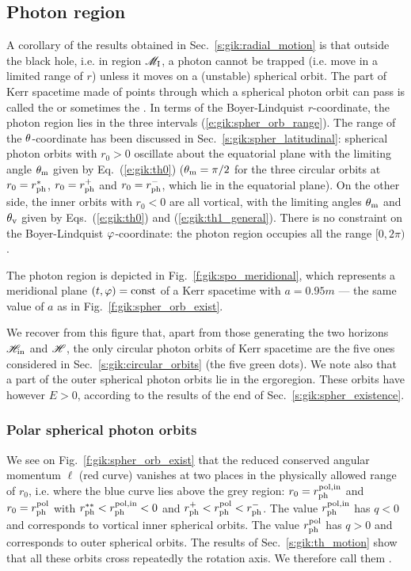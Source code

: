\subsection{Photon region}

A corollary of the results obtained in Sec.~\ref{s:gik:radial_motion}
is that outside the black hole, i.e. in region $\mathscr{M}_{\rm I}$, a photon
cannot be trapped (i.e. move in a limited range of $r$) unless it moves
on a (unstable) spherical orbit. The part of Kerr spacetime made of points
through which a spherical photon orbit can pass is called the
 or sometimes the  \cite{Johns_al20}. In terms of the Boyer-Lindquist $r$-coordinate, the photon region
lies in the three intervals (\ref{e:gik:spher_orb_range}).
The range of the $\theta$-coordinate has been discussed in Sec.~\ref{s:gik:spher_latitudinal}:
spherical photon orbits with $r_0 > 0$ oscillate about the equatorial plane
with the limiting angle $\theta_{\rm m}$ given by Eq.~(\ref{e:gik:th0}) ($\theta_{\rm m}=\pi/2$
for the three circular orbits at $r_0 = r_{\rm ph}^*$, $r_0=r_{\rm ph}^+$
and $r_0 = r_{\rm ph}^-$, which lie in the equatorial plane). On the other side,
the inner orbits with $r_0 < 0$ are all vortical, with the limiting
angles $\theta_{\rm m}$ and $\theta_{\rm v}$ given by Eqs.~(\ref{e:gik:th0}) and (\ref{e:gik:th1_general}).
There is no constraint on the Boyer-Lindquist $\varphi$-coordinate: the photon region occupies
all the range $[0, 2\pi)$.

The photon region is depicted in Fig.~\ref{f:gik:spo_meridional}, which represents
a meridional plane $(t,\varphi) = \mathrm{const}$ of a Kerr spacetime with $a=0.95 m$
--- the same value of $a$ as in Fig.~\ref{f:gik:spher_orb_exist}.

We recover from this figure that, apart from those generating the two horizons $\mathscr{H}_{\rm in}$
and $\mathscr{H}$, the only circular photon orbits of Kerr spacetime are the
five ones considered in Sec.~\ref{s:gik:circular_orbits} (the five green dots).
We note also that a part of the outer spherical photon orbits lie in the ergoregion. These orbits
have however $E>0$, according to the results of the end of Sec.~\ref{s:gik:spher_existence}.

\subsubsection{Polar spherical photon orbits}

We see on Fig.~\ref{f:gik:spher_orb_exist} that the reduced conserved
angular momentum $\ell$ (red curve) vanishes at two
places in the physically allowed range of $r_0$,
i.e. where the blue curve lies above the grey region:
$r_0=r_{\rm ph}^{\rm pol,in}$ and $r_0=r_{\rm ph}^{\rm pol}$
with $r_{\rm ph}^{**} < r_{\rm ph}^{\rm pol,in} < 0$ and
$r_{\rm ph}^+ < r_{\rm ph}^{\rm pol} < r_{\rm ph}^-$.
The value $r_{\rm ph}^{\rm pol,in}$ has $q<0$ and corresponds to
vortical inner spherical orbits.
The value $r_{\rm ph}^{\rm pol}$ has $q >0$
and corresponds to outer spherical orbits.
The results of Sec.~\ref{s:gik:th_motion} show that all these orbits cross
repeatedly the rotation axis. We therefore call them
.

